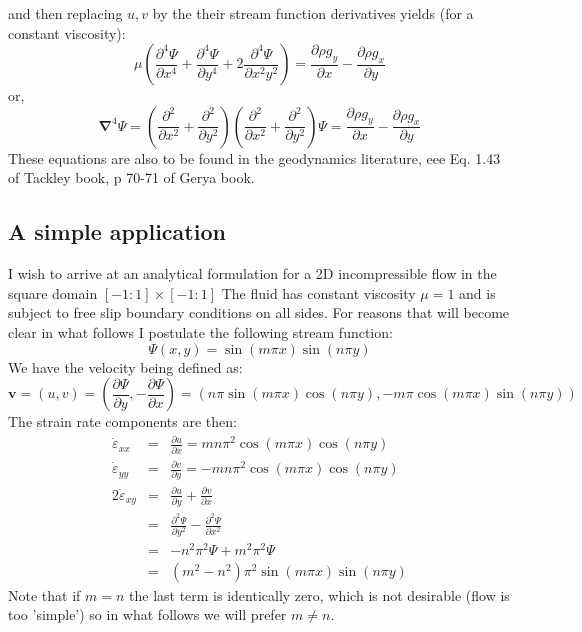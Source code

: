 and then replacing $u,v$ by the their stream function derivatives yields (for a constant viscosity):
\begin{equation}
\mu \left(\frac{\partial^4 \Psi}{\partial x^4} + 
\frac{\partial^4 \Psi}{\partial y^4} + 
2\frac{\partial^4 \Psi}{\partial x^2y^2} \right)
=
\frac{\partial \rho g_y}{\partial x} - \frac{\partial \rho g_x}{\partial y}   
\end{equation}
or, 
\begin{equation}
{\bm \nabla}^4 \Psi 
=
\left(\frac{\partial^2 }{\partial x^2} + \frac{\partial^2 }{\partial y^2} \right) 
\left(\frac{\partial^2 }{\partial x^2} + \frac{\partial^2 }{\partial y^2} \right) \Psi
=
\frac{\partial \rho g_y}{\partial x} - \frac{\partial \rho g_x}{\partial y}   
\end{equation}
These equations are also to be found in the geodynamics literature, eee Eq. 1.43 of Tackley book, p 70-71 of Gerya book.

\subsection{A simple application}
I wish to arrive at an analytical formulation for a 2D incompressible flow in the square domain $[-1:1]\times[-1:1]$
The fluid has constant viscosity $\mu=1$ and is subject to free slip boundary conditions on all sides.
For reasons that will become clear in what follows I postulate the following stream function:
\begin{equation}
\Psi(x,y)=\sin( m \pi x)\sin( n\pi y)
\end{equation}
We have the velocity being defined as:
\begin{equation}
{\bm v} = (u,v) = \left( \frac{\partial \Psi}{\partial y},-\frac{\partial \Psi}{\partial x} \right) 
= (n \pi \sin (m\pi x)\cos(n\pi y),-m\pi \cos(m\pi x)\sin (n\pi y))
\end{equation}
The strain rate components are then:
\begin{eqnarray}
\dot\varepsilon_{xx} &=&  \frac{\partial u}{\partial x} = mn \pi^ 2  \cos (m\pi x)\cos(n\pi y)   \\
\dot\varepsilon_{yy} &=&  \frac{\partial v}{\partial y} = -mn \pi^ 2  \cos (m\pi x)\cos(n\pi y)  \\
2\dot\varepsilon_{xy} &=&  \frac{\partial u}{\partial y} +  \frac{\partial v}{\partial x}    \\
&=&  \frac{\partial^2 \Psi}{\partial y^2} -  \frac{\partial^2 \Psi}{\partial x^2}    \\
&=& -n^2\pi^2 \Psi + m^2 \pi^2 \Psi \\
&=& (m^2-n^2) \pi^2   \sin( m \pi x)\sin( n\pi y)
\end{eqnarray}
Note that if $m=n$ the last term is identically zero, which is not desirable 
(flow is too 'simple')
so in what follows we will prefer $m\neq n$.

